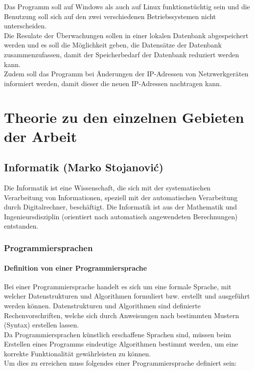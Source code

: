 \documentclass[12pt,a4paper]{report}
\begin{document}
\begin{onehalfspace}
Das Programm soll auf Windows als auch auf Linux funktionstüchtig sein und die Benutzung soll sich auf den zwei verschiedenen Betriebssystemen nicht unterscheiden.\\
Die Resulate der Überwachungen sollen in einer lokalen Datenbank abgespeichert werden und es soll die Möglichkeit geben, die Datensätze der Datenbank zusammenzufassen, damit der Speicherbedarf der Datenbank reduziert werden kann.\\
Zudem soll das Programm bei Änderungen der IP-Adressen von Netzwerkgeräten informiert werden, damit dieser die neuen IP-Adressen nachtragen kann.

\part{Theorie zu den einzelnen Gebieten der Arbeit}


\chapter{Informatik (Marko Stojanovi\'{c})}
Die Informatik ist eine Wissenschaft, die sich mit der systematischen Verarbeitung von Informationen, speziell mit der automatischen Verarbeitung durch Digitalrechner, beschäftigt. Die Informatik ist aus der Mathematik und Ingenieursdisziplin (orientiert nach automatisch angewendeten Berechnungen) entstanden.

\section{Programmiersprachen}

\subsection{Definition von einer Programmiersprache}
Bei einer Programmiersprache handelt es sich um eine formale Sprache, mit welcher Datenstrukturen und Algorithmen formuliert bzw. erstellt und ausgeführt werden können. Datenstrukturen und Algorithmen sind definierte Rechenvorschriften, welche sich durch Anweisungen nach bestimmten Mustern (Syntax) erstellen lassen.\\

Da Programmiersprachen künstlich erschaffene Sprachen sind, müssen beim Erstellen eines Programms eindeutige Algorithmen bestimmt werden, um eine korrekte Funktionalität gewährleisten zu können.\\
Um dies zu erreichen muss folgendes einer Programmiersprache definiert sein:


\end{onehalfspace}
\end{document}
